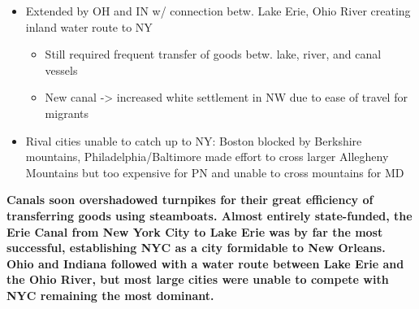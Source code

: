 \documentclass[a4paper]{article}
\begin{document}
{\begin{itemize}
\begin{itemize}
\begin{itemize}
\begin{itemize}
                    \item Erie Canal largest construction project to date w/ forty foot-wide ditch four feet deep; required difficult cuts and aqueducts to carry canal across streams, heavy masonry w/ wooden gates
                    \item Instant financial success w/ extremely heavy traffic -> repaid entire cost w/in 7 years 
                    \item Route to Great Lakes provided direct access to Chicago from NYC -> NYC began to compete w/ New Orleans
                \end{itemize}
                \item Extended by OH and IN w/ connection betw. Lake Erie, Ohio River creating inland water route to NY 
                \begin{itemize}
                    \item Still required frequent transfer of goods betw. lake, river, and canal vessels
                    \item New canal -> increased white settlement in NW due to ease of travel for migrants
                \end{itemize}
                \item Rival cities unable to catch up to NY: Boston blocked by Berkshire mountains, Philadelphia/Baltimore made effort to cross larger Allegheny Mountains but too expensive for PN and unable to cross mountains for MD
            \end{itemize}
        \end{itemize}
    \end{itemize}
    \textbf{Canals soon overshadowed turnpikes for their great efficiency of transferring goods using steamboats. Almost entirely state-funded, the Erie Canal from New York City to Lake Erie was by far the most successful, establishing NYC as a city formidable to New Orleans. Ohio and Indiana followed with a water route between Lake Erie and the Ohio River, but most large cities were unable to compete with NYC remaining the most dominant.}}
\end{document}
